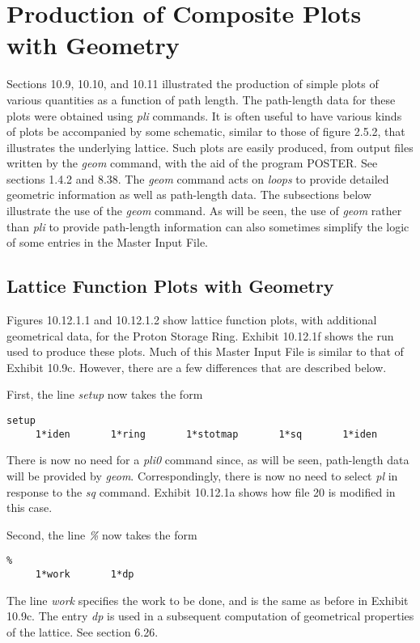 \section{Production of Composite Plots with Geometry}  
\label{compplots}
Sections 10.9, 10.10, and 10.11 illustrated the production of simple plots
of various quantities as a function of path length.  The path-length data
for these plots were obtained using {\em pli} commands.  It is often useful to have various kinds of plots be accompanied by some
schematic, similar to those of figure 2.5.2, that illustrates the
underlying lattice.  Such plots are easily produced, from output files
written by the {\em geom} command, with the aid of the program POSTER.
See sections 1.4.2 and 8.38.  The {\em geom} command acts on {\em loops}
to provide detailed geometric information as well as path-length data.
The subsections below illustrate the use of the {\em geom} command.  As
will be seen, the use of {\em geom} rather than {\em pli} to provide
path-length information can also sometimes simplify the logic of some entries in the
Master Input File.

\subsection{Lattice Function Plots with Geometry}
\label{latfunplots}
Figures 10.12.1.1 and 10.12.1.2 show lattice function plots, with
additional geometrical data, for the Proton Storage Ring.  Exhibit
10.12.1f shows the \Mary run used to produce these plots.  Much of this
Master Input File is similar to that of Exhibit 10.9c.  However, there
are a few differences that are described below.

First, the line {\em setup} now takes the form
\begin{footnotesize}
\begin{verbatim}
setup
     1*iden       1*ring       1*stotmap       1*sq       1*iden
\end{verbatim}
\end{footnotesize}
There is now no need for a {\em pli0} command since, as will be seen,
path-length data will be provided by {\em geom}.  Correspondingly, there
is now no need to select {\em pl} in response to the {\em sq} command.
Exhibit 10.12.1a shows how file 20 is modified in this case.

Second, the line {\em \%} now takes the form
\begin{footnotesize}
\begin{verbatim}
%
     1*work       1*dp
\end{verbatim}
\end{footnotesize}
The line {\em work} specifies the work to be done, and is the same as
before in Exhibit 10.9c.  The entry {\em dp} is used in a subsequent
computation of geometrical properties of the lattice.  See section 6.26.

